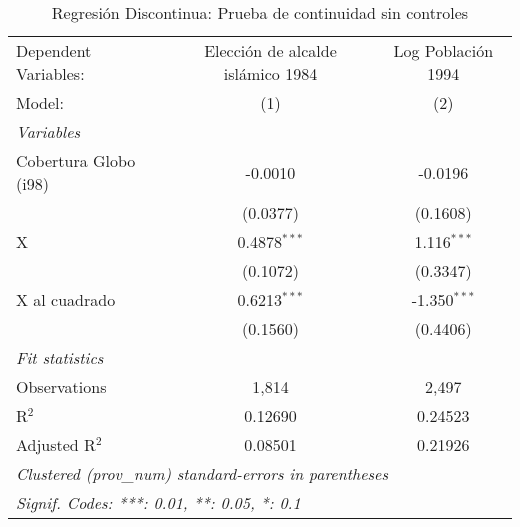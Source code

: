 
\begin{table}[htbp]
   \caption{Regresión Discontinua: Prueba de continuidad sin controles}
   \centering
   \begin{tabular}{lcc}
      \tabularnewline \midrule \midrule
      Dependent Variables:  & Elección de alcalde islámico 1984 & Log Población 1994\\  
      Model:                & (1)                               & (2)\\  
      \midrule
      \emph{Variables}\\
      Cobertura Globo (i98) & -0.0010                           & -0.0196\\   
                            & (0.0377)                          & (0.1608)\\   
      X                     & 0.4878$^{***}$                    & 1.116$^{***}$\\   
                            & (0.1072)                          & (0.3347)\\   
      X al cuadrado         & 0.6213$^{***}$                    & -1.350$^{***}$\\   
                            & (0.1560)                          & (0.4406)\\   
      \midrule
      \emph{Fit statistics}\\
      Observations          & 1,814                             & 2,497\\  
      R$^2$                 & 0.12690                           & 0.24523\\  
      Adjusted R$^2$        & 0.08501                           & 0.21926\\  
      \midrule \midrule
      \multicolumn{3}{l}{\emph{Clustered (prov\_num) standard-errors in parentheses}}\\
      \multicolumn{3}{l}{\emph{Signif. Codes: ***: 0.01, **: 0.05, *: 0.1}}\\
   \end{tabular}
\end{table}



